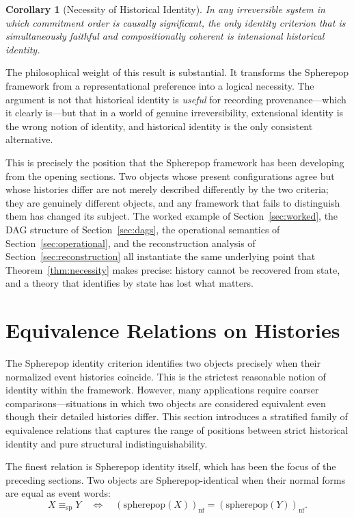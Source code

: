 \documentclass[12pt]{article}
\theoremstyle{plain}
\newtheorem{corollary}[theorem]{Corollary}
\theoremstyle{definition}
\theoremstyle{remark}
\begin{document}
\begin{corollary}[Necessity of Historical Identity]
\label{cor:necessity}
In any irreversible system in which commitment order is causally significant,
the only identity criterion that is simultaneously faithful and compositionally
coherent is intensional historical identity.
\end{corollary}

The philosophical weight of this result is substantial.  It transforms the
Spherepop framework from a representational preference into a logical necessity.
The argument is not that historical identity is \emph{useful} for recording
provenance---which it clearly is---but that in a world of genuine irreversibility,
extensional identity is the wrong notion of identity, and historical identity
is the only consistent alternative.

This is precisely the position that the Spherepop framework has been developing
from the opening sections.  Two objects whose present configurations agree but
whose histories differ are not merely described differently by the two criteria;
they are genuinely different objects, and any framework that fails to distinguish
them has changed its subject.  The worked example of Section~\ref{sec:worked},
the DAG structure of Section~\ref{sec:dags}, the operational semantics of
Section~\ref{sec:operational}, and the reconstruction analysis of
Section~\ref{sec:reconstruction} all instantiate the same underlying
point that Theorem~\ref{thm:necessity} makes precise: history cannot be
recovered from state, and a theory that identifies by state has lost what
matters.

\section{Equivalence Relations on Histories}
\label{sec:equivalences}

The Spherepop identity criterion identifies two objects precisely when their
normalized event histories coincide.  This is the strictest reasonable notion
of identity within the framework.  However, many applications require coarser
comparisons---situations in which two objects are considered equivalent even
though their detailed histories differ.  This section introduces a stratified
family of equivalence relations that captures the range of positions between
strict historical identity and pure structural indistinguishability.

The finest relation is Spherepop identity itself, which has been the focus
of the preceding sections.  Two objects are Spherepop-identical when their
normal forms are equal as event words:
\[
  X \equiv_{\mathrm{sp}} Y
  \quad \Longleftrightarrow \quad
  (\text{spherepop}(X))_{\mathrm{nf}} = (\text{spherepop}(Y))_{\mathrm{nf}}.
\]
\end{document}
